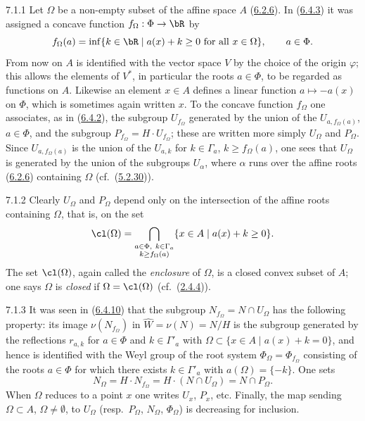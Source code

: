 \documentclass[12pt,a4paper,oneside,english]{smfart}
\newcommand{\btref}[1]{\hyperlink{bt:#1}{#1}}
\theoremstyle{definition}
\theoremstyle{bt}
\begin{document}
\begin{btpar}{7.1.1}
Let $\Omega$ be a non-empty subset of the affine space $A$ (\btref{6.2.6}). In
(\btref{6.4.3}) it was assigned a concave function $f_\Omega:\Phi\to\bR$ by
\[
  f_\Omega(a)=\inf\{k\in\bR\mid a(x)+k\ge0 \text{ for all } x\in\Omega\},
  \qquad a\in\Phi .
\]
From now on $A$ is identified with the vector space $V$ by the choice of
the origin $\varphi$; this allows the elements of $V^{*}$, in particular
the roots $a\in\Phi$, to be regarded as functions on $A$. Likewise an
element $x\in A$ defines a linear function $a\mapsto-a(x)$ on $\Phi$,
which is sometimes again written $x$. To the concave function
$f_\Omega$ one associates, as in (\btref{6.4.2}), the subgroup $U_{f_\Omega}$
generated by the union of the $U_{a,f_\Omega(a)}$, $a\in\Phi$, and the
subgroup $P_{f_\Omega}=H\cdot U_{f_\Omega}$; these are written more
simply $U_\Omega$ and $P_\Omega$. Since $U_{a,f_\Omega(a)}$ is the union
of the $U_{a,k}$ for $k\in\Gamma_a$, $k\ge f_\Omega(a)$, one sees that
$U_\Omega$ is generated by the union of the subgroups $U_\alpha$, where
$\alpha$ runs over the affine roots (\btref{6.2.6}) containing $\Omega$
(cf.\ (\btref{5.2.30})).
\end{btpar}

\begin{btpar}{7.1.2}
Clearly $U_\Omega$ and $P_\Omega$ depend only on the intersection of the
affine roots containing $\Omega$, that is, on the set
\[
  \cl(\Omega)=\bigcap_{\substack{a\in\Phi,\ k\in\Gamma_a\\ k\ge f_\Omega(a)}}
  \{x\in A\mid a(x)+k\ge0\}.
\]
The set $\cl(\Omega)$, again called the \emph{enclosure} of $\Omega$, is a
closed convex subset of $A$; one says $\Omega$ is \emph{closed} if
$\Omega=\cl(\Omega)$ (cf.\ (\btref{2.4.4})).
\end{btpar}

\begin{btpar}{7.1.3}
It was seen in (\btref{6.4.10}) that the subgroup $N_{f_\Omega}=N\cap U_\Omega$
has the following property: its image $\nu(N_{f_\Omega})$ in
$\widehat{W}=\nu(N)=N/H$ is the subgroup generated by the reflections
$r_{a,k}$ for $a\in\Phi$ and $k\in\Gamma'_a$ with
$\Omega\subset\{x\in A\mid a(x)+k=0\}$, and hence is identified with the
Weyl group of the root system $\Phi_\Omega=\Phi_{f_\Omega}$ consisting of
the roots $a\in\Phi$ for which there exists $k\in\Gamma'_a$ with
$a(\Omega)=\{-k\}$. One sets
\[
  N_\Omega=H\cdot N_{f_\Omega}=H\cdot(N\cap U_\Omega)=N\cap P_\Omega .
\]
When $\Omega$ reduces to a point $x$ one writes $U_x$, $P_x$, etc.
Finally, the map sending $\Omega\subset A$, $\Omega\ne\emptyset$, to
$U_\Omega$ (resp.\ $P_\Omega$, $N_\Omega$, $\Phi_\Omega$) is decreasing
for inclusion.
\end{btpar}
\end{document}
